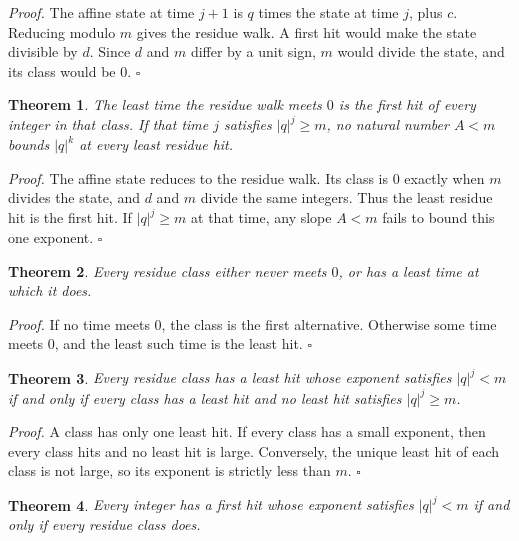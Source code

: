 \documentclass[11pt,letterpaper]{article}
\newtheorem{theorem}{Theorem}
\newenvironment{proof}{\noindent\textit{Proof.}}{\hfill\(\square\)}
\begin{document}
\begin{proof}
The affine state at time \(j+1\) is \(q\) times the state at time \(j\), plus \(c\). Reducing modulo \(m\) gives the residue walk. A first hit would make the state divisible by \(d\). Since \(d\) and \(m\) differ by a unit sign, \(m\) would divide the state, and its class would be \(0\).
\end{proof}

\begin{theorem}
\label{thm:classhit}
The least time the residue walk meets \(0\) is the first hit of every integer in that class. If that time \(j\) satisfies \(\lvert q\rvert^j\ge m\), no natural number \(A<m\) bounds \(\lvert q\rvert^k\) at every least residue hit.
\end{theorem}

\begin{proof}
The affine state reduces to the residue walk. Its class is \(0\) exactly when \(m\) divides the state, and \(d\) and \(m\) divide the same integers. Thus the least residue hit is the first hit. If \(\lvert q\rvert^j\ge m\) at that time, any slope \(A<m\) fails to bound this one exponent.
\end{proof}

\begin{theorem}
\label{thm:classsplit}
Every residue class either never meets \(0\), or has a least time at which it does.
\end{theorem}

\begin{proof}
If no time meets \(0\), the class is the first alternative. Otherwise some time meets \(0\), and the least such time is the least hit.
\end{proof}

\begin{theorem}
\label{thm:slopecrit}
Every residue class has a least hit whose exponent satisfies \(\lvert q\rvert^j<m\) if and only if every class has a least hit and no least hit satisfies \(\lvert q\rvert^j\ge m\).
\end{theorem}

\begin{proof}
A class has only one least hit. If every class has a small exponent, then every class hits and no least hit is large. Conversely, the unique least hit of each class is not large, so its exponent is strictly less than \(m\).
\end{proof}

\begin{theorem}
\label{thm:integerslope}
Every integer has a first hit whose exponent satisfies \(\lvert q\rvert^j<m\) if and only if every residue class does.
\end{theorem}
\end{document}
